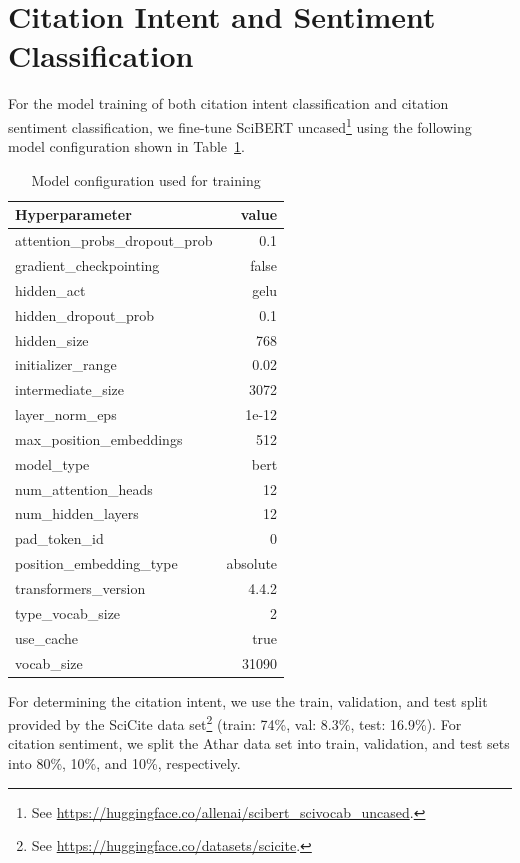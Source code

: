 \section{Citation Intent and Sentiment Classification}\label{app:classifcation}

For the model training of both citation intent classification and citation sentiment classification, we fine-tune SciBERT uncased\footnote{See \url{https://huggingface.co/allenai/scibert_scivocab_uncased}.} using the following model configuration shown in Table~\ref{tab:modelconf}.

\begin{table}
\caption{Model configuration used for training}
 \label{tab:modelconf}
  \centering
  \begin{small}
 \begin{threeparttable}
 \begin{tabular}{lr}
 \toprule
   Hyperparameter & value \\
   \midrule
  attention\_probs\_dropout\_prob &  0.1 \\
  gradient\_checkpointing &  false \\
  hidden\_act &  gelu \\
  hidden\_dropout\_prob &  0.1 \\
  hidden\_size &  768 \\
  initializer\_range &  0.02 \\
  intermediate\_size &  3072 \\
  layer\_norm\_eps &  1e-12 \\
  max\_position\_embeddings &  512 \\
  model\_type &  bert \\
  num\_attention\_heads &  12 \\
  num\_hidden\_layers &  12 \\
  pad\_token\_id &  0 \\
  position\_embedding\_type &  absolute \\
  transformers\_version &  4.4.2 \\
  type\_vocab\_size &  2 \\
  use\_cache &  true \\
  vocab\_size &  31090 \\
   \bottomrule
 \end{tabular}
\end{threeparttable}
  \end{small}
\end{table}

For determining the citation intent, we use the train, validation, and test split provided by the SciCite data set\footnote{See \url{https://huggingface.co/datasets/scicite}.} (train: 74\%, val: 8.3\%, test: 16.9\%). For citation sentiment, we split the Athar data set into train, validation, and test sets into 80\%, 10\%, and 10\%, respectively.



